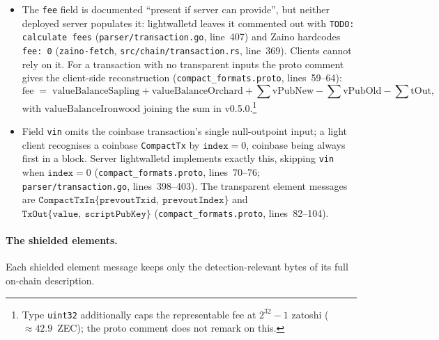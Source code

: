 \documentclass[11pt,a4paper]{article}
\theoremstyle{definition}
\begin{document}
\begin{itemize}
  protocol byte order; the proto comment mandates that it ``MUST NOT be
  reversed or hex-encoded'' --- the reversed hex form is display-only ---
  citing protocol spec \href{https://zips.z.cash/protocol/protocol.pdf\#txnidentifiers}{\S7.1.1}, ``Transaction Identifiers''
  (\texttt{compact\_formats.proto}, lines~52--57).
\item The \texttt{fee} field is documented ``present if server can
  provide'', but neither deployed server populates it:
  \textsf{lightwalletd} leaves it commented out with \texttt{TODO:
  calculate fees} (\texttt{parser/\allowbreak transaction.go},
  line~407) and
  \textsf{Zaino} hardcodes \texttt{fee: 0} (\texttt{zaino-fetch},
  \texttt{src/\allowbreak chain/\allowbreak transaction.rs}, line~369).
  Clients cannot rely on it. For a transaction with no transparent inputs
  the proto comment gives the client-side reconstruction
  (\texttt{compact\_formats.proto}, lines~59--64):
  \[
  \mathrm{fee} \;=\; \mathrm{valueBalanceSapling}
    + \mathrm{valueBalanceOrchard}
    + \textstyle\sum \mathrm{vPubNew}
    - \sum \mathrm{vPubOld}
    - \sum \mathrm{tOut},
  \]
  with $\mathrm{valueBalanceIronwood}$ joining the sum in
  v0.5.0.\footnote{Type \texttt{uint32} additionally caps the representable
  fee at $2^{32}-1$ zatoshi ($\approx 42.9$~ZEC); the proto comment does not
  remark on this.}
\item Field \texttt{vin} omits the coinbase transaction's single
  null-outpoint input; a light client recognises a coinbase
  \texttt{CompactTx} by $\texttt{index} = 0$, coinbase being always first in
  a block. Server \textsf{lightwalletd} implements exactly this, skipping
  \texttt{vin} when $\texttt{index} = 0$ (\texttt{compact\_formats.proto},
  lines~70--76; \texttt{parser/transaction.go}, lines~398--403). The
  transparent element messages are
  $\texttt{CompactTxIn}\{\texttt{prevoutTxid},\ \texttt{prevoutIndex}\}$ and
  $\texttt{TxOut}\{\texttt{value},\ \texttt{scriptPubKey}\}$
  (\texttt{compact\_formats.proto}, lines~82--104).
\end{itemize}

\paragraph{The shielded elements.} Each shielded element message keeps only
the detection-relevant bytes of its full on-chain description.
\end{document}
